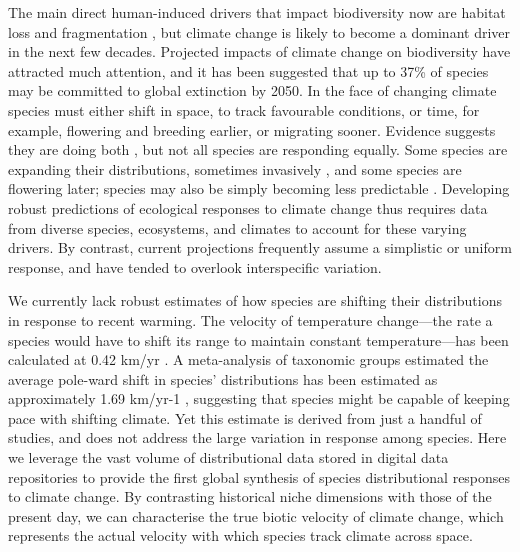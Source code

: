 \documentclass[12pt]{report}
\begin{document}
The main direct human-induced drivers that impact biodiversity now are
habitat loss \supercite{Newbold2015} and fragmentation
\supercite{Haddad2015}, but climate change is likely to become a
dominant driver in the next few
decades\supercite{Parmesan2003,Thuiller2007,Urban2015}. Projected
impacts of climate change on biodiversity have attracted much
attention, and it has been suggested that up to 37\% of species may be
committed to global extinction by 2050\supercite{Thomas2004}. In the
face of changing climate species must either shift in space, to track
favourable conditions, or time, for example, flowering and breeding
earlier, or migrating sooner. Evidence suggests they are doing both
\supercite{Parmesan2003,Parmesan2006,Menzel2006,Chen2011}, but not all
species are responding equally. Some species are expanding their
distributions, sometimes invasively \supercite{Hellmann2008}, and some
species are flowering later\supercite{Cook2012}; species may also be
simply becoming less predictable \supercite{Pearse2017phenology}.
Developing robust predictions of ecological responses to climate
change thus requires data from diverse species, ecosystems, and
climates to account for these varying drivers. By contrast, current
projections frequently assume a simplistic or uniform response, and
have tended to overlook interspecific variation.

We currently lack robust estimates of how species are shifting their
distributions in response to recent warming. The velocity of
temperature change---the rate a species would have to shift its range
to maintain constant temperature---has been calculated at 0.42 km/yr
\supercite{Loarie2009}. A meta-analysis of taxonomic groups estimated
the average pole-ward shift in species' distributions has been
estimated as approximately 1.69 km/yr-1 \supercite{Chen2011},
suggesting that species might be capable of keeping pace with shifting
climate. Yet this estimate is derived from just a handful of studies,
and does not address the large variation in response among species.
Here we leverage the vast volume of distributional data stored in
digital data repositories\supercite{url_gbif} to provide the first
global synthesis of species distributional responses to climate
change. By contrasting historical niche dimensions with those of the
present day, we can characterise the true biotic velocity of climate
change, which represents the actual velocity with which species track
climate across space.
\end{document}
